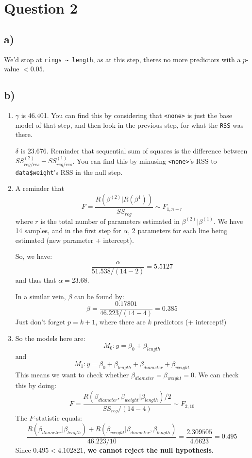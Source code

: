 \documentclass{article}
\begin{document}
\section*{Question 2}
\subsection*{a)}
We'd stop at \verb|rings ~ length|, as at this step, theres no more predictors with a $p$-value $< 0.05$. 

\subsection*{b)}
\begin{enumerate}
    \item $\gamma$ is 46.401. You can find this by considering that \verb|<none>| is just the base model of that step, and then look in the 
    previous step, for what the \verb|RSS| was there.

    $\delta$ is 23.676. Reminder that sequential sum of squares is the difference between $SS^{(2)}_{reg/res} - SS^{(1)}_{reg/res}$.
    You can find this by minusing \verb|<none>|'s RSS to \verb|data$weight|'s RSS in the null step.
    \item A reminder that
    $$ F = \frac{R(\beta^{(2)}|R(\beta^{1}))}{SS_{reg}}\sim F_{1, n-r}$$
    where $r$ is the total number of parameters estimated in $\beta^{(2)}|\beta^{(1)}$. We have 14 samples,
    and in the first step for $\alpha$, 2 parameters for each line being estimated (new parameter + intercept). 

    So, we have:
    $$ \frac{\alpha}{51.538/(14 - 2)} = 5.5127$$
    and thus that $\alpha = 23.68$.

    In a similar vein, $\beta$ can be found by:
    $$ \beta = \frac{0.17801}{46.223/(14 - 4)}=0.385$$
    Just don't forget $p = k + 1$, where there are $k$ predictors (+ intercept!)
    \item So the models here are:
    $$ M_0 : y = \beta_0 + \beta_{length}$$
    and
    $$ M_1 : y = \beta_0 + \beta_{length} + \beta_{diameter} + \beta_{weight}$$
    This means we want to check whether $\beta_{diameter} = \beta_{weight} = 0$. We can check this by
    doing:
    $$ F = \frac{R(\beta_{diameter}, \beta_{weight}|\beta_{length}) / 2}{SS_{reg} / (14 - 4)} \sim F_{2, 10}$$
    The $F$-statistic equals:
    $$ \frac{R(\beta_{diameter}|\beta_{length}) + R(\beta_{weight}|\beta_{diameter},\beta_{length})}{46.223 / 10} = \frac{2.309505}{4.6623} = 0.495$$
    Since $0.495 < 4.102821$, \textbf{we cannot reject the null hypothesis}.
\end{enumerate}
\newpage
\end{document}
